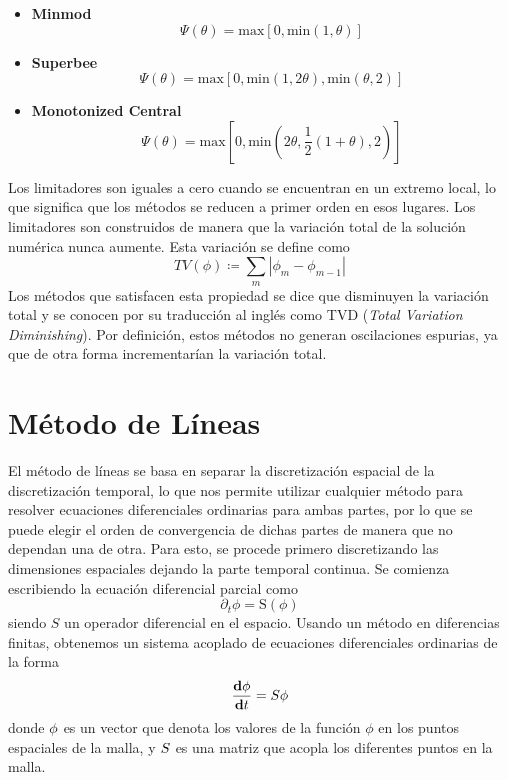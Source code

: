\documentclass[11pt,twoside,openright,spanish]{report}
\numberwithin{equation}{chapter}
\numberwithin{figure}{chapter}
\numberwithin{table}{chapter}
\begin{document}
\begin{itemize}
	\item \textbf{Minmod}
	\begin{equation}
	\Psi\left(\theta\right)=\text{max}\left[0,\text{min}(1,\theta)\right]
	\end{equation}
	\item \textbf{Superbee}
	\begin{equation}
	\Psi\left(\theta\right)=\text{max}\left[0,\text{min}\left(1,2\theta\right),\text{min}\left(\theta,2\right)\right]
	\end{equation}
	\item \textbf{Monotonized Central}
	\begin{equation}
	\Psi\left(\theta\right)=\text{max}\left[0,\text{min}\left(2\theta,\frac{1}{2}\left(1+\theta\right),2\right)\right]
	\end{equation}
\end{itemize}

Los limitadores son iguales a cero cuando se encuentran en un extremo local, lo que significa que los métodos se reducen a primer orden en esos lugares. Los limitadores son construidos de manera que la variación total de la solución numérica nunca aumente. Esta variación se define como
\begin{equation}
TV(\phi)\coloneqq\sum_{m}\left|\phi_m-\phi_{m-1}\right|
\end{equation} 
Los métodos que satisfacen esta propiedad se dice que disminuyen la variación total y se conocen por su traducción al inglés como TVD (\textit{Total Variation Diminishing}). Por definición, estos métodos no generan oscilaciones espurias, ya que de otra forma incrementarían la variación total.

\section{Método de Líneas}
\noindent
El método de líneas se basa en separar la discretización espacial de la discretización temporal, lo que nos permite utilizar cualquier método para resolver ecuaciones diferenciales ordinarias para ambas partes, por lo que se puede elegir el orden de convergencia de dichas partes de manera que no dependan una de otra. Para esto, se procede primero discretizando las dimensiones espaciales dejando la parte temporal continua. Se comienza escribiendo la ecuación diferencial parcial como
\begin{equation}
\partial_t\phi=\mathrm{S}\left(\phi\right)
\end{equation} 
siendo $S$ un operador diferencial en el espacio. Usando un método en diferencias finitas, obtenemos un sistema acoplado de ecuaciones diferenciales ordinarias de la forma
\begin{equation}
\frac{\text{\textbf{d}}\boldmath{\phi}}{\text{\textbf{d}}t}=\boldmath{S}\boldmath{\phi}
\end{equation}
donde $\boldmath{\phi}$ es un vector que denota los valores de la función $\phi$ en los puntos espaciales de la malla, y $\boldmath{S}$ es una matriz que acopla los diferentes puntos en la malla.
\end{document}
